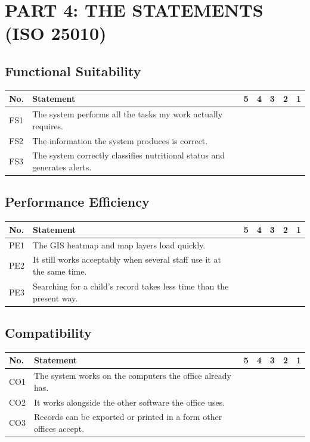 \documentclass[12pt, a4paper]{report}
\begin{document}
\vspace{0.5cm}

\section*{PART 4: THE STATEMENTS (ISO 25010)}
\subsection*{Functional Suitability}
\begin{tabular}{|p{1cm}|p{9cm}|p{0.7cm}|p{0.7cm}|p{0.7cm}|p{0.7cm}|p{0.7cm}|}
\hline
\textbf{No.} & \textbf{Statement} & \textbf{5} & \textbf{4} & \textbf{3} & \textbf{2} & \textbf{1} \\
\hline
FS1 & The system performs all the tasks my work actually requires. & & & & & \\
\hline
FS2 & The information the system produces is correct. & & & & & \\
\hline
FS3 & The system correctly classifies nutritional status and generates alerts. & & & & & \\
\hline
\end{tabular}

\vspace{0.3cm}
\subsection*{Performance Efficiency}
\begin{tabular}{|p{1cm}|p{9cm}|p{0.7cm}|p{0.7cm}|p{0.7cm}|p{0.7cm}|p{0.7cm}|}
\hline
\textbf{No.} & \textbf{Statement} & \textbf{5} & \textbf{4} & \textbf{3} & \textbf{2} & \textbf{1} \\
\hline
PE1 & The GIS heatmap and map layers load quickly. & & & & & \\
\hline
PE2 & It still works acceptably when several staff use it at the same time. & & & & & \\
\hline
PE3 & Searching for a child's record takes less time than the present way. & & & & & \\
\hline
\end{tabular}

\vspace{0.3cm}
\subsection*{Compatibility}
\begin{tabular}{|p{1cm}|p{9cm}|p{0.7cm}|p{0.7cm}|p{0.7cm}|p{0.7cm}|p{0.7cm}|}
\hline
\textbf{No.} & \textbf{Statement} & \textbf{5} & \textbf{4} & \textbf{3} & \textbf{2} & \textbf{1} \\
\hline
CO1 & The system works on the computers the office already has. & & & & & \\
\hline
CO2 & It works alongside the other software the office uses. & & & & & \\
\hline
CO3 & Records can be exported or printed in a form other offices accept. & & & & & \\
\hline
\end{tabular}
\end{document}

